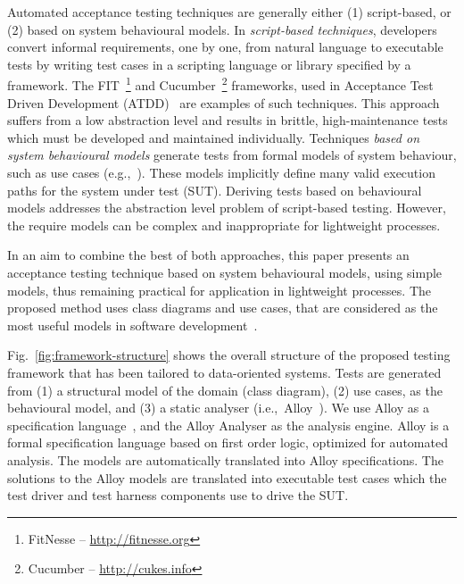  

Automated acceptance testing techniques are generally either (1) script-based, or (2) based on system behavioural models. 
In \textit{script-based techniques}, developers convert informal requirements, one by one, from natural language to executable tests by writing test cases in a scripting language or library specified by a framework. The FIT~\footnote{FitNesse – \url{http://fitnesse.org}} and Cucumber~\footnote{Cucumber – \url{http://cukes.info}} frameworks, used in Acceptance Test Driven Development (ATDD)~\cite{Pugh2011} are examples of such techniques. This approach suffers from a low abstraction level and results in brittle, high-maintenance tests which must be developed and maintained individually. 
Techniques \textit{based on system behavioural models} generate tests from formal models of system behaviour, such as use cases (e.g.,~\cite{Nebut2006,Sarma2007,Kaplan2008}). These models implicitly define many valid execution paths for the system under test (SUT). %
Deriving tests based on behavioural models addresses the abstraction level problem of script-based testing. However, the require models can be complex and inappropriate for lightweight processes.%

In an aim to combine the best of both approaches, this paper presents an acceptance testing technique based on system behavioural models, using simple models, thus remaining practical for application in lightweight processes.%
The proposed method uses class diagrams and use cases, that are considered as the most useful models in software development~\cite{Erickson2007,Erickson2008}. 


Fig.~\ref{fig:framework-structure} shows the overall structure of the proposed testing framework that has been tailored to data-oriented systems. Tests are generated from (1) a structural model of the domain (class diagram), (2) use cases, as the behavioural model, and (3) a static analyser (i.e.,\ Alloy~\cite{Jackson2002}). We use Alloy as a specification language~\cite{Jackson2002}, and the Alloy Analyser as the analysis engine. Alloy is a formal specification language based on first order logic, optimized for automated analysis.
The models are automatically translated into Alloy specifications. The solutions to the Alloy models are translated into executable test cases which the test driver and test harness components use to drive the SUT.

